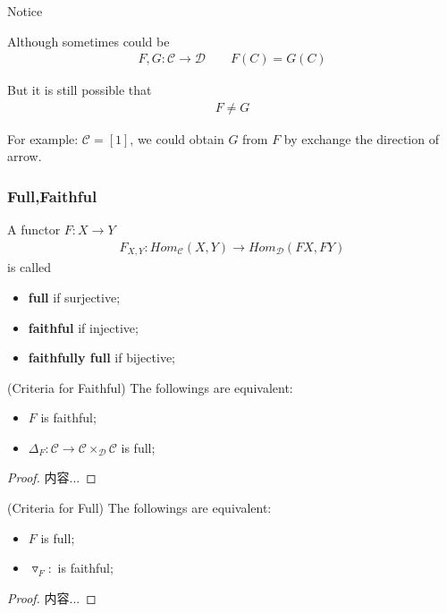 \documentclass[Total.tex]{subfiles}
\begin{document}
				Notice
				
				\begin{example}
					Although sometimes could be
					\begin{gather*}
						F,G:\mathcal{C}\rightarrow \mathcal{D}\qquad F(C)=G(C)
					\end{gather*}
					
					But it is still possible that
					\begin{gather*}
						F\not=G
					\end{gather*}
					
					For example: $\mathcal{C}=[1]$, we could obtain $G$ from $F$ by exchange the direction of arrow.
				\end{example}
				\subsubsection{Full,Faithful}
					\begin{Def}
						A functor $F:X\rightarrow Y$
						\begin{gather*}
							F_{X,Y}:Hom_\mathcal{C}(X,Y)\rightarrow Hom_\mathcal{D}(FX,FY)
						\end{gather*} is called
						\begin{itemize}
							\item \textbf{full} if surjective; 
							\item \textbf{faithful} if injective;
							\item \textbf{faithfully full} if bijective;
						\end{itemize}
					\end{Def}
					
					\begin{proposition}
						(Criteria for Faithful) The followings are equivalent:
						\begin{itemize}
							\item $F$ is faithful;
							\item $\Delta_F:\mathcal{C}\rightarrow \mathcal{C}\times_\mathcal{D} \mathcal{C}$ is full;
						\end{itemize}
					\end{proposition}
					\begin{proof}
						内容...
					\end{proof}
					
					\begin{proposition}
						(Criteria for Full) The followings are equivalent:
						\begin{itemize}
							\item $F$ is full;
							\item $\triangledown_F:$ is faithful;
						\end{itemize}
					\end{proposition}
					\begin{proof}
						内容...
					\end{proof}
					
\end{document}
